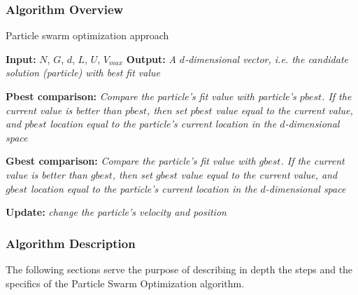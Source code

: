
\subsubsection{Algorithm Overview}

\begin{algorithm}
	\caption{Particle swarm optimization approach} \label{alg:pso}
	\begin{algorithmic}
		\newline
			\textbf{Input:} $N$, $G$, $d$, $L$, $U$, $V_{max}$\newline
			\textbf{Output:} \textit{A $d$-dimensional vector, i.e. the candidate solution (particle) with best fit value}
				\State \begin{varwidth}[t]{.85\textwidth} 
					\textbf{Pbest comparison:} \textit{Compare the particle's fit value with particle's $pbest$.
						If the current value is better than $pbest$, then set $pbest$ value equal to the current value, and $pbest$ location equal to the particle's current location in the $d$-dimensional space}
					\end{varwidth}
				\State \begin{varwidth}[t]{.85\textwidth} 
					\textbf{Gbest comparison:} \textit{Compare the particle's fit value with $gbest$.
						If the current value is better than $gbest$, then set $gbest$ value equal to the current value, and $gbest$ location equal to the particle's current location in the $d$-dimensional space}
					\end{varwidth}
				\State \textbf{Update:} \textit{change the particle's velocity and position}
		\EndProcedure
	\end{algorithmic}
\end{algorithm}

\subsubsection{Algorithm Description}

The following sections serve the purpose of describing in depth the steps
and the specifics of the Particle Swarm Optimization algorithm.

